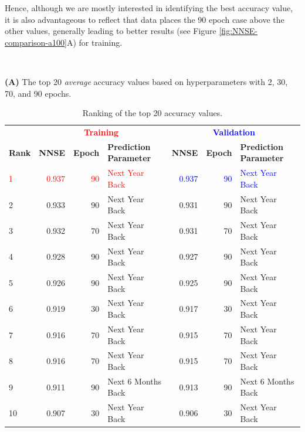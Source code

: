 \documentclass[utf8]{FrontiersinVancouver} %
\begin{document}
Hence, although we are mostly interested in identifying the best accuracy value, it is also advantageous to reflect that data places the 90 epoch case above the other values, generally leading to better results (see Figure \ref{fig:NNSE-comparison-a100}A) for training.


    \begin{table}[htb]
      \caption{Ranking of the top 20 accuracy values.}\
      \label{tab:ranking-accuracy}
    
        {\bf (A)} The top 20 {\em average} accuracy values based on hyperparameters with 2, 30, 70, and 90 epochs.\

\renewcommand{\arraystretch}{1.2}
      \begin{center}
        {\footnotesize
    \begin{tabular}{|l||r|r|l|r|r|l|}
      \hline
     &   \multicolumn{3}{c|}{\bf \textcolor{red}{Training}}  & \multicolumn{3}{c|}{\bf \textcolor{blue}{Validation}}  \\
    {\bf Rank} &  {\bf NNSE} &  {\bf Epoch} & {\bf Prediction Parameter} & {\bf NNSE} &  {\bf Epoch} & {\bf Prediction Parameter}\\
    \hline
    \hline
        \textcolor{red}{1}  &  \textcolor{red}{0.937} &     \textcolor{red}{90} &  \textcolor{red}{Next Year Back} &  \textcolor{blue}{0.937} &     \textcolor{blue}{90} &  \textcolor{blue}{Next Year Back} \\
    2  &  0.933 &     90 &      Next Year Back &  0.931 &     90 &      Next Year Back \\
3  &  0.932 &     70 &      Next Year Back &  0.931 &     70 &      Next Year Back \\
4  &  0.928 &     90 &      Next Year Back &  0.927 &     90 &      Next Year Back \\
5  &  0.926 &     90 &      Next Year Back &  0.925 &     90 &      Next Year Back \\
6  &  0.919 &     30 &      Next Year Back &  0.917 &     30 &      Next Year Back \\
7  &  0.916 &     70 &      Next Year Back &  0.915 &     70 &      Next Year Back \\
8  &  0.916 &     70 &      Next Year Back &  0.915 &     70 &      Next Year Back \\
9  &  0.911 &     90 &  Next 6 Months Back &  0.913 &     90 &  Next 6 Months Back \\
10  &  0.907 &     30 &      Next Year Back &  0.906 &     30 &      Next Year Back \\

\end{tabular}}
\end{center}
\end{table}
\end{document}
